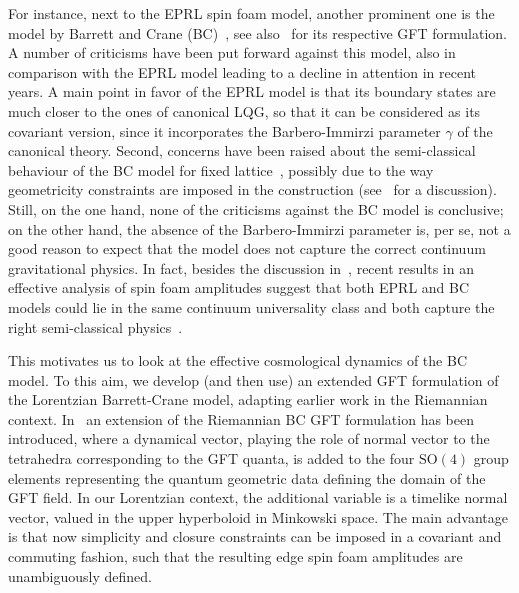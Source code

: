 \documentclass[11pt,a4paper]{article}
\begin{document}
For instance, next to the EPRL spin foam model, another prominent one is the model by Barrett and Crane (BC)~\cite{Perez:2000ec,Barrett:1999qw}, see also~\cite{DePietri:1999bx,Perez:2000ec,Perez:2000ep,Baratin:2011tx} for its respective GFT formulation. A number of criticisms have been put forward against this model, also in comparison with the EPRL model leading to a decline in attention in recent years. A main point in favor of the EPRL model is that its boundary states are much closer to the ones of canonical LQG, so that it can be considered as its covariant version, since it incorporates the Barbero-Immirzi parameter $\gamma$ of the canonical theory. Second, concerns have been raised about the semi-classical behaviour of the BC model for fixed lattice~\cite{Barrett:2002ur,Kaminski:2013yca,Dittrich:2021kzs}, possibly due to the way geometricity constraints are imposed in the construction (see~\cite{Baratin:2010wi,Baratin:2011tx} for a discussion). Still, on the one hand, none of the criticisms against the BC model is conclusive; on the other hand, the absence of the Barbero-Immirzi parameter is, per se, not a good reason to expect that the model does not capture the correct continuum gravitational physics. In fact, besides the discussion in~\cite{Baratin:2011tx}, recent results in an effective analysis of spin foam amplitudes suggest that both EPRL and BC models could lie in the same continuum universality class and both capture the right semi-classical physics~\cite{Dittrich:2021kzs}. 

This motivates us to look at the effective cosmological dynamics of the BC model. To this aim, we develop (and then use) an extended GFT formulation of the Lorentzian Barrett-Crane model, adapting earlier work in the Riemannian context. In~\cite{Baratin:2011tx} an extension of the Riemannian BC GFT formulation has been introduced, where a dynamical vector, playing the role of normal vector to the tetrahedra corresponding to the GFT quanta, is added to the four $\text{SO}(4)$ group elements representing the quantum geometric data defining the domain of the GFT field. In our Lorentzian context, the additional variable is a timelike normal vector, valued in the upper hyperboloid in Minkowski space. The main advantage is that now simplicity and closure constraints can be imposed in a covariant and commuting fashion, such that the resulting edge spin foam amplitudes are unambiguously defined.  
\end{document}
